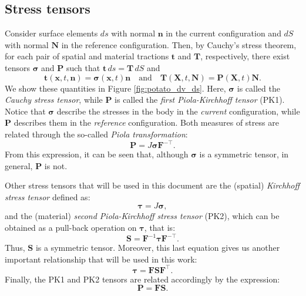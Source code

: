 \documentclass{sfuthesis}
\numberwithin{equation}{section}
\numberwithin{figure}{chapter}
\numberwithin{table}{chapter}
\theoremstyle{definition}
\def\*#1{{\mathbf{#1}}} %
\newcommand{\T}{\top}
\def\bsigma{{\bm{\sigma}}}
\def\btau{{\bm{\tau}}}
\begin{document}
\subsection{Stress tensors}

Consider surface elements $ds$ with normal $\*n$ in the current configuration and $dS$ with normal $\*N$ in the reference configuration. Then, by Cauchy's stress theorem, for each pair of spatial and material tractions $\*t$ and $\*T$, respectively, there exist tensors $\bsigma$ and $\*P$ such that $\*t \, ds = \*T \, dS$ and
\begin{equation}
    \*t(\*x,t,\*n) = \bsigma(\*x,t) \*n \quad \text{and} \quad  \*T(\*X,t,\*N) = \*P(\*X,t)\*N.
\end{equation}
We show these quantities in Figure \ref{fig:potato_dv_ds}. Here, $\bsigma$ is called the \textit{Cauchy stress tensor}, while $\*P$ is called the \textit{first Piola-Kirchhoff tensor} (PK1). Notice that $\bsigma$ describe the stresses in the body in the \textit{current} configuration, while $\*P$ describes them in the \textit{reference} configuration. Both measures of stress are related through the so-called \textit{Piola transformation}:
\begin{equation} \label{eq:def_PK1}
    \*P = J \bsigma \*F^{-\T}.
\end{equation}
From this expression, it can be seen that, although $\bsigma$ is a symmetric tensor, in general, $\*P$ is not.

Other stress tensors that will be used in this document are the (spatial) \textit{Kirchhoff stress tensor} defined as:
\begin{equation}
    \btau = J \bsigma,
\end{equation}
and the (material) \textit{second Piola-Kirchhoff stress tensor} (PK2), which can be obtained as a pull-back operation on $\btau$, that is:
\begin{equation} \label{eq:def_PK2}
    \*S = \*F^{-1} \btau \*F^{-\T}.
\end{equation}
Thus, $\*S$ is a symmetric tensor. Moreover, this last equation gives us another important relationship that will be used in this work:
\begin{equation} \label{eq:push_forward_tau}
\btau = \*F \*S \*F^{\T}.
\end{equation}
Finally, the PK1 and PK2 tensors are related accordingly by the expression:
\begin{equation}
\*P = \*F \*S.
\end{equation}
\end{document}
